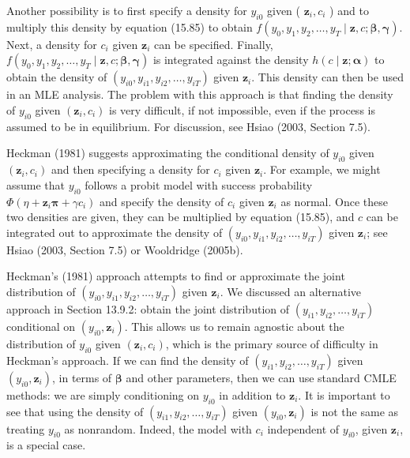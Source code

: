 \documentclass[10pt]{article}
\begin{document}
Another possibility is to first specify a density for $y_{i 0}$ given ( $\mathbf{z}_{i}, c_{i}$ ) and to multiply this density by equation (15.85) to obtain $f\left(y_{0}, y_{1}, y_{2}, \ldots, y_{T} \mid \mathbf{z}, c ; \boldsymbol{\beta}, \boldsymbol{\gamma}\right)$. Next, a density for $c_{i}$ given $\mathbf{z}_{i}$ can be specified. Finally, $f\left(y_{0}, y_{1}, y_{2}, \ldots, y_{T} \mid \mathbf{z}, c ; \boldsymbol{\beta}, \boldsymbol{\gamma}\right)$ is integrated against the density $h(c \mid \mathbf{z} ; \boldsymbol{\alpha})$ to obtain the density of $\left(y_{i 0}, y_{i 1}, y_{i 2}, \ldots, y_{i T}\right)$ given $\mathbf{z}_{i}$. This density can then be used in an MLE analysis. The problem with this approach is that finding the density of $y_{i 0}$ given $\left(\mathbf{z}_{i}, c_{i}\right)$ is very difficult, if not impossible, even if the process is assumed to be in equilibrium. For discussion, see Hsiao (2003, Section 7.5).

Heckman (1981) suggests approximating the conditional density of $y_{i 0}$ given $\left(\mathbf{z}_{i}, c_{i}\right)$ and then specifying a density for $c_{i}$ given $\mathbf{z}_{i}$. For example, we might assume that $y_{i 0}$ follows a probit model with success probability $\Phi\left(\eta+\mathbf{z}_{i} \boldsymbol{\pi}+\gamma c_{i}\right)$ and specify the density of $c_{i}$ given $\mathbf{z}_{i}$ as normal. Once these two densities are given, they can be multiplied by equation (15.85), and $c$ can be integrated out to approximate the density of $\left(y_{i 0}, y_{i 1}, y_{i 2}, \ldots, y_{i T}\right)$ given $\mathbf{z}_{i}$; see Hsiao (2003, Section 7.5) or Wooldridge (2005b).

Heckman's (1981) approach attempts to find or approximate the joint distribution of $\left(y_{i 0}, y_{i 1}, y_{i 2}, \ldots, y_{i T}\right)$ given $\mathbf{z}_{i}$. We discussed an alternative approach in Section 13.9.2: obtain the joint distribution of $\left(y_{i 1}, y_{i 2}, \ldots, y_{i T}\right)$ conditional on $\left(y_{i 0}, \mathbf{z}_{i}\right)$. This allows us to remain agnostic about the distribution of $y_{i 0}$ given $\left(\mathbf{z}_{i}, c_{i}\right)$, which is the primary source of difficulty in Heckman's approach. If we can find the density of $\left(y_{i 1}, y_{i 2}, \ldots, y_{i T}\right)$ given $\left(y_{i 0}, \mathbf{z}_{i}\right)$, in terms of $\boldsymbol{\beta}$ and other parameters, then we can use standard CMLE methods: we are simply conditioning on $y_{i 0}$ in addition to $\mathbf{z}_{i}$. It is important to see that using the density of $\left(y_{i 1}, y_{i 2}, \ldots, y_{i T}\right)$ given $\left(y_{i 0}, \mathbf{z}_{i}\right)$ is not the same as treating $y_{i 0}$ as nonrandom. Indeed, the model with $c_{i}$ independent of $y_{i 0}$, given $\mathbf{z}_{i}$, is a special case.
\end{document}
